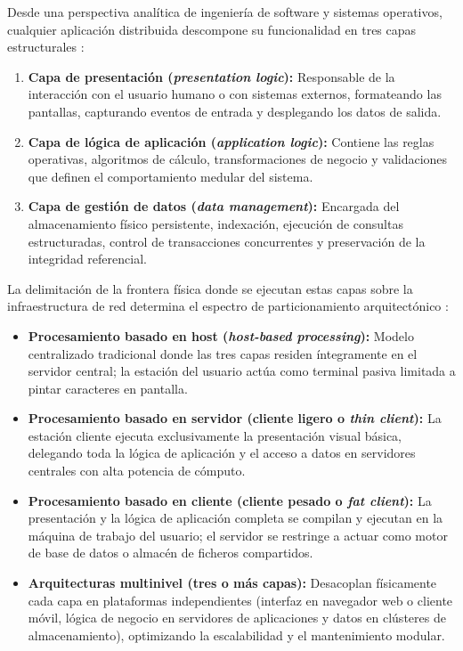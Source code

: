 \documentclass[12pt]{article}
\begin{document}
Desde una perspectiva analítica de ingeniería de software y sistemas operativos, cualquier aplicación distribuida descompone su funcionalidad en tres capas estructurales \parencite[\S 18.1, pp.\ 18-5--18-6]{stallings2018operating}:
\begin{enumerate}[noitemsep, topsep=2pt, parsep=0pt]
    \item \textbf{Capa de presentación (\textit{presentation logic}):} Responsable de la interacción con el usuario humano o con sistemas externos, formateando las pantallas, capturando eventos de entrada y desplegando los datos de salida.
    \item \textbf{Capa de lógica de aplicación (\textit{application logic}):} Contiene las reglas operativas, algoritmos de cálculo, transformaciones de negocio y validaciones que definen el comportamiento medular del sistema.
    \item \textbf{Capa de gestión de datos (\textit{data management}):} Encargada del almacenamiento físico persistente, indexación, ejecución de consultas estructuradas, control de transacciones concurrentes y preservación de la integridad referencial.
\end{enumerate}

La delimitación de la frontera física donde se ejecutan estas capas sobre la infraestructura de red determina el espectro de particionamiento arquitectónico \parencite[\S 18.1, pp.\ 18-6--18-9]{stallings2018operating}:
\begin{itemize}[noitemsep, topsep=2pt, parsep=0pt]
    \item \textbf{Procesamiento basado en host (\textit{host-based processing}):} Modelo centralizado tradicional donde las tres capas residen íntegramente en el servidor central; la estación del usuario actúa como terminal pasiva limitada a pintar caracteres en pantalla.
    \item \textbf{Procesamiento basado en servidor (cliente ligero o \textit{thin client}):} La estación cliente ejecuta exclusivamente la presentación visual básica, delegando toda la lógica de aplicación y el acceso a datos en servidores centrales con alta potencia de cómputo.
    \item \textbf{Procesamiento basado en cliente (cliente pesado o \textit{fat client}):} La presentación y la lógica de aplicación completa se compilan y ejecutan en la máquina de trabajo del usuario; el servidor se restringe a actuar como motor de base de datos o almacén de ficheros compartidos.
    \item \textbf{Arquitecturas multinivel (tres o más capas):} Desacoplan físicamente cada capa en plataformas independientes (interfaz en navegador web o cliente móvil, lógica de negocio en servidores de aplicaciones y datos en clústeres de almacenamiento), optimizando la escalabilidad y el mantenimiento modular.
\end{itemize}
\end{document}
